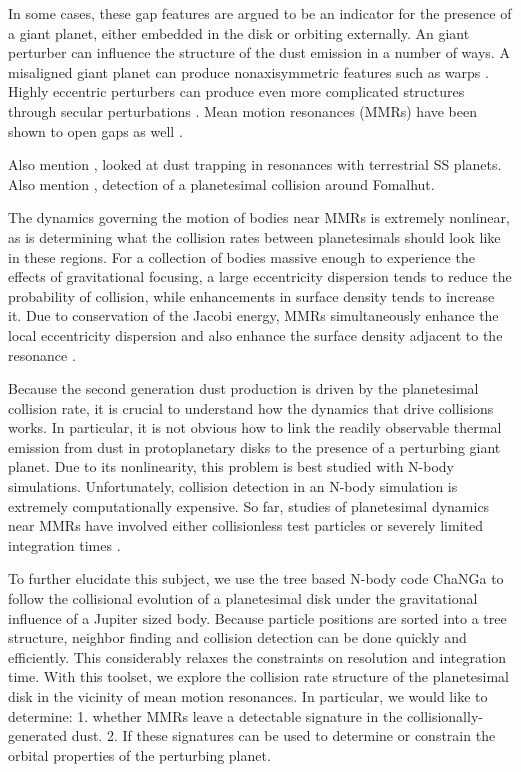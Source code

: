 \documentclass[onecolumn]{aastex63}
\begin{document}
In some cases, these gap features are argued to be an indicator for the presence of a giant planet, either embedded in the disk 
\citep{2015MNRAS.453L..73D} or orbiting externally. An giant perturber can influence the structure of the dust emission in a number 
of ways. A misaligned giant planet can produce nonaxisymmetric features such as warps \citep{2001A&A...370..447A}. Highly 
eccentric perturbers can produce even more complicated structures through secular perturbations \citep{2014MNRAS.443.2541P, 
2015MNRAS.448.3679P}. Mean motion resonances (MMRs) have been shown to open gaps as well
\citep{2015ApJ...798...83N, 2016ApJ...818..159T, 2018ApJ...857....3T}.

Also mention \citet{2020A&A...635A..10S}, looked at dust trapping in resonances with terrestrial SS planets. Also mention 
\citet{2020arXiv200408736G}, detection of a planetesimal collision around Fomalhut.

The dynamics governing the motion of bodies near MMRs is extremely nonlinear, as is determining what the collision rates between 
planetesimals should look like in these regions. For a collection of bodies massive enough to experience the effects of gravitational 
focusing, a large eccentricity dispersion tends to reduce the probability of collision, while enhancements in surface density tends to 
increase it. Due to conservation of the Jacobi energy, MMRs simultaneously enhance the local eccentricity dispersion and also 
enhance the surface density adjacent to the resonance \citep{2000Icar..143...45R, 2017ApJ...850..103B}.

Because the second generation dust production is driven by the planetesimal collision rate, it is crucial to understand how the 
dynamics that drive collisions works. In particular, it is not obvious how to link the readily observable thermal emission from dust in 
protoplanetary disks to the presence of a perturbing giant planet. Due to its nonlinearity, this problem is best studied with N-body 
simulations. Unfortunately, collision detection in an N-body simulation is extremely computationally expensive. So far, studies of 
planetesimal dynamics near MMRs have involved either collisionless test particles \citep{2017ApJ...850..103B, 2016ApJ...818..159T, 
2018ApJ...857....3T} or severely limited integration times \citep{2000Icar..143...45R}.

To further elucidate this subject, we use the tree based N-body code {\sc ChaNGa}
\citep{2008IEEEpds...ChaNGa, 2015AphCom..2..1} to follow the collisional evolution of a planetesimal disk under the gravitational 
influence of a Jupiter sized body. Because particle positions are sorted into a tree structure, neighbor finding and collision detection 
can be done quickly and efficiently. This considerably relaxes the constraints on resolution and integration time. With this toolset, we 
explore the collision rate structure of the planetesimal disk in the vicinity of mean motion resonances. In particular, we would like to 
determine: 1. whether MMRs leave a detectable signature in the collisionally-generated dust. 2. If these signatures can be used to determine or constrain the orbital properties of the perturbing planet.
\end{document}
